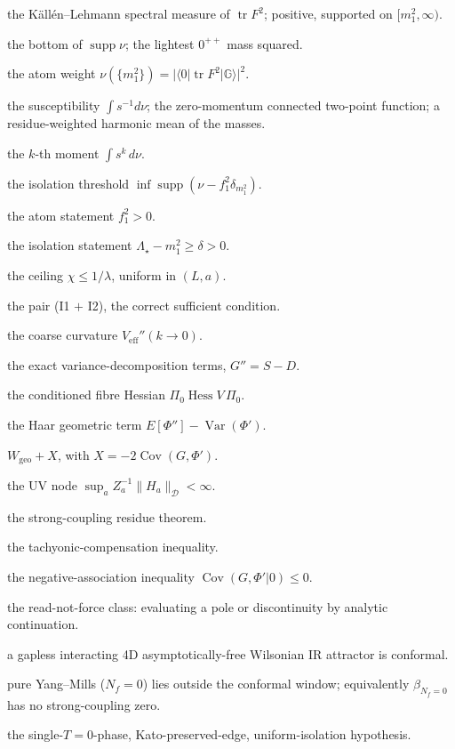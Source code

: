 \begin{description}[leftmargin=2.2em,style=nextline,itemsep=1pt]
\item[$\nu$] the K\"all\'en--Lehmann spectral measure of $\operatorname{tr}F^2$; positive,
  supported on $[m_1^2,\infty)$.
\item[$m_1^2$] the bottom of $\operatorname{supp}\nu$; the lightest $0^{++}$ mass squared.
\item[$f_1^2$] the atom weight $\nu(\{m_1^2\})=|\langle0|\operatorname{tr}F^2|\mathbb G\rangle|^2$.
\item[$\chi$] the susceptibility $\int s^{-1}d\nu$; the zero-momentum connected two-point
  function; a residue-weighted harmonic mean of the masses.
\item[$M_k$] the $k$-th moment $\int s^k\,d\nu$.
\item[$\Lambda_\star$] the isolation threshold $\inf\operatorname{supp}(\nu-f_1^2\delta_{m_1^2})$.
\item[I1] the atom statement $f_1^2>0$.
\item[I2] the isolation statement $\Lambda_\star-m_1^2\ge\delta>0$.
\item[H1] the ceiling $\chi\le1/\lambda$, uniform in $(L,a)$.
\item[$H^*$] the pair (I1 $+$ I2), the correct sufficient condition.
\item[$G''$] the coarse curvature $V_{\mathrm{eff}}''(k\to0)$.
\item[$S,D$] the exact variance-decomposition terms, $G''=S-D$.
\item[$K$] the conditioned fibre Hessian $\Pi_0\operatorname{Hess}V\,\Pi_0$.
\item[$W_{\mathrm{geo}}$] the Haar geometric term $E[\Phi'']-\operatorname{Var}(\Phi')$.
\item[$W_{\mathrm{full}}$] $W_{\mathrm{geo}}+X$, with $X=-2\operatorname{Cov}(G,\Phi')$.
\item[L3] the UV node $\sup_aZ_a^{-1}\|H_a\|_{\mathcal D}<\infty$.
\item[P3] the strong-coupling residue theorem.
\item[TCI] the tachyonic-compensation inequality.
\item[NA] the negative-association inequality $\operatorname{Cov}(G,\Phi'|0)\le0$.
\item[A3] the read-not-force class: evaluating a pole or discontinuity by analytic
  continuation.
\item[$(\star)$] a gapless interacting 4D asymptotically-free Wilsonian IR attractor is
  conformal.
\item[$(G1)$] pure Yang--Mills ($N_f=0$) lies outside the conformal window; equivalently
  $\beta_{N_f=0}$ has no strong-coupling zero.
\item[CP] the single-$T=0$-phase, Kato-preserved-edge, uniform-isolation hypothesis.
\end{description}

